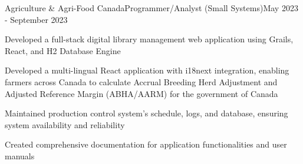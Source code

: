 \begin{resume_employer}{Agriculture \& Agri-Food Canada}{Programmer/Analyst (Small Systems)}{}{May 2023 - September 2023}
    \item Developed a full-stack digital library management web application using Grails, React, and H2 Database Engine
    \item Developed a multi-lingual React application with i18next integration, enabling farmers across Canada to calculate Accrual Breeding Herd Adjustment and Adjusted Reference Margin (ABHA/AARM) for the government of Canada
    \item Maintained production control system's schedule, logs, and database, ensuring system availability and reliability
    \item Created comprehensive documentation for application functionalities and user manuals
\end{resume_employer}

